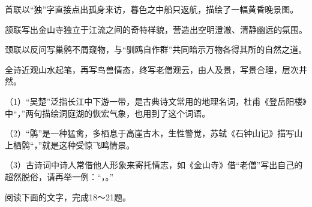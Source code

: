 \documentclass[11pt,a4paper]{ctexart}
\begin{document}
\begin{choices}
\item 首联以“独”字直接点出孤身来访，暮色之中船只返航，描绘了一幅黄昏晚景图。
\item 颔联写出金山寺独立于江流之间的奇特样貌，营造出空明澄澈、清静幽远的氛围。
\item 颈联以反问写巢鹘不屑窥物，与“驯鸥自作群”共同暗示万物各得其所的自然之道。
\item 全诗近观山水起笔，再写鸟兽情态，终写老僧观云，由人及景，写景合理，层次井然。
\end{choices}


\par\vspace{2.2em}


（1）“吴楚”泛指长江中下游一带，是古典诗文常用的地理名词，杜甫《登岳阳楼》中“\blank[6.5em]，\blank[6.5em]”两句描绘洞庭湖的恢宏气象，也用到了这个词语。

（2）“鹘”是一种猛禽，多栖息于高崖古木，生性警觉，苏轼《石钟山记》描写山上栖鹘“\blank[6.5em]，\blank[6.5em]”就是这种受惊飞鸣情景。

（3）古诗词中诗人常借他人形象来寄托情志，如《金山寺》借“老僧”写出自己的超然脱俗，请再举一例：“\blank[6.5em]，\blank[6.5em]。”

阅读下面的文字，完成18～21题。
\end{document}
